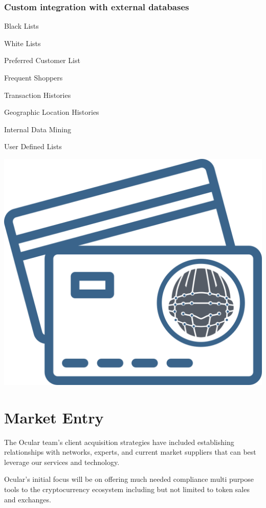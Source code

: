 \documentclass[a4paper]{article}
\let\tempone\itemize
\let\temptwo\enditemize
\renewenvironment{itemize}{\tempone\addtolength{\itemsep}{-5pt}}{\temptwo}
\begin{document}
\subsubsection*{Custom integration with external databases}
\begin{itemize}
\item Black Lists
\item White Lists
\item Preferred Customer List
\item Frequent Shoppers
\item Transaction Histories
\item Geographic Location Histories
\item Internal Data Mining
\item User Defined Lists 
\end{itemize}

\clearpage


\centerline{\includegraphics[width=1.0\textwidth]{ocular-creditcard}}

\section{Market Entry}
The Ocular team’s client acquisition strategies have included establishing relationships with networks, experts, and current market suppliers that can best leverage our services and technology. 

Ocular’s initial focus will be on offering much needed compliance multi purpose tools to the cryptocurrency ecosystem including but not limited to token sales and exchanges.
\end{document}
